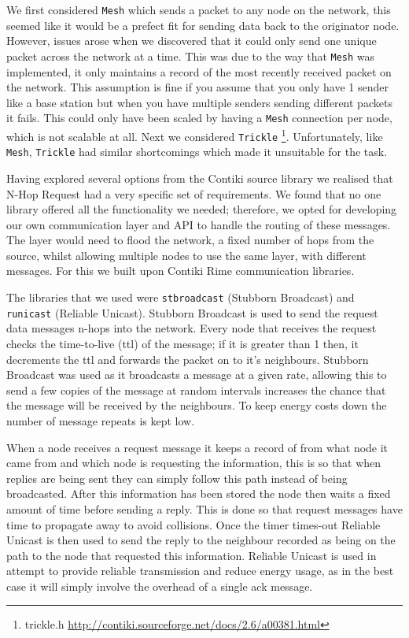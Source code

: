We first considered \verb|Mesh| which sends a packet to any node on the network, this seemed like it would be a prefect fit for sending data back to the originator node. However, issues arose when we discovered that it could only send one unique packet across the network at a time. This was due to the way that \verb|Mesh| was implemented, it only maintains a record of the most recently received packet on the network. This assumption is fine if you assume that you only have 1 sender like a base station but when you have multiple senders sending different packets it fails. This could only have been scaled by having a \verb|Mesh| connection per node, which is not scalable at all. Next we considered \verb|Trickle| \footnote{trickle.h \url{http://contiki.sourceforge.net/docs/2.6/a00381.html}}. Unfortunately, like \verb|Mesh|, \verb|Trickle| had similar shortcomings which made it unsuitable for the task.

Having explored several options from the Contiki source library we realised that N-Hop Request had a very specific set of requirements. We found that no one library offered all the functionality we needed; therefore, we opted for developing our own communication layer and API to handle the routing of these messages. The layer would need to flood the network, a fixed number of hops from the source, whilst allowing multiple nodes to use the same layer, with different messages. For this we built upon Contiki Rime communication libraries.

The libraries that we used were \verb|stbroadcast| (Stubborn Broadcast) and \verb|runicast| (Reliable Unicast). Stubborn Broadcast is used to send the request data messages n-hops into the network. Every node that receives the request checks the time-to-live (ttl) of the message; if it is greater than 1 then, it decrements the ttl and forwards the packet on to it's neighbours. Stubborn Broadcast was used as it broadcasts a message at a given rate, allowing this to send a few copies of the message at random intervals increases the chance that the message will be received by the neighbours. To keep energy costs down the number of message repeats is kept low.

When a node receives a request message it keeps a record of from what node it came from and which node is requesting the information, this is so that when replies are being sent they can simply follow this path instead of being broadcasted. After this information has been stored the node then waits a fixed amount of time before sending a reply. This is done so that request messages have time to propagate away to avoid collisions. Once the timer times-out Reliable Unicast is then used to send the reply to the neighbour recorded as being on the path to the node that requested this information. Reliable Unicast is used in attempt to provide reliable transmission and reduce energy usage, as in the best case it will simply involve the overhead of a single ack message.

